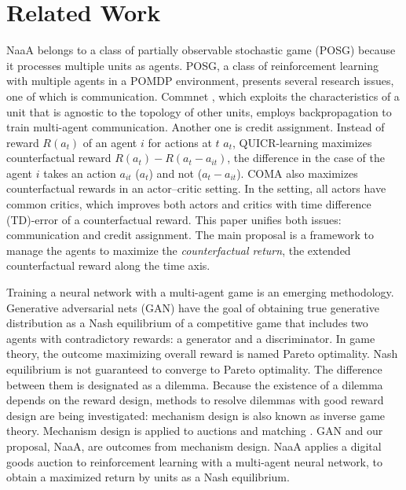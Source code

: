 \section{Related Work}
NaaA belongs to a class of partially observable stochastic game (POSG) \citep{hansen2004dynamic} because it processes multiple units as agents.
POSG, a class of reinforcement learning with multiple agents in a POMDP environment, presents several research issues, one of which is communication.
Commnet \citep{sukhbaatar2016learning}, which exploits the characteristics of a unit that is agnostic to the topology of other units, employs backpropagation to train multi-agent communication.
Another one is credit assignment.
Instead of reward $R(a_t)$ of an agent $i$ for actions at $t$ $a_t$, 
QUICR-learning \citep{agogino2006quicr} maximizes counterfactual reward $R(a_t) - R(a_t - a_{it})$, the difference in the case of the agent $i$ takes an action $a_{it}$ ($a_t$) and not ($a_t-a_{it}$).
COMA \citep{foerster2017counterfactual} also maximizes counterfactual rewards in an actor--critic setting.
In the setting, all actors have common critics, which improves both actors and critics with time difference (TD)-error of a counterfactual reward.
This paper unifies both issues: communication and credit assignment.
The main proposal is a framework to manage the agents to maximize the {\em counterfactual return}, the extended counterfactual reward along the time axis.

Training a neural network with a multi-agent game is an emerging methodology.
Generative adversarial nets (GAN) \citep{goodfellow2014generative} have the goal of obtaining true generative distribution as a Nash equilibrium of a competitive game that includes two agents with contradictory rewards: a generator and a discriminator. 
In game theory, the outcome maximizing overall reward is named Pareto optimality.
Nash equilibrium is not guaranteed to converge to Pareto optimality. The difference between them is designated as a dilemma.
Because the existence of a dilemma depends on the reward design, methods to resolve dilemmas with good reward design are being investigated: mechanism design \citep{myerson1983mechanism} is also known as inverse game theory.
Mechanism design is applied to auctions \citep{vickrey1961counterspeculation} and matching \citep{gale1962college}.
GAN and our proposal, NaaA, are outcomes from mechanism design.
NaaA applies a digital goods auction \citep{guruswami2005profit} to reinforcement learning with a multi-agent neural network, 
to obtain a maximized return by units as a Nash equilibrium.

